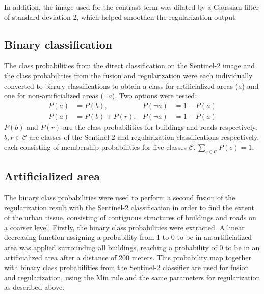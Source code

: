\documentclass[10pt]{article}
\begin{document}
In addition, the image used for the contrast term was dilated by a Gaussian filter of standard deviation 2, which helped smoothen the regularization output.

\subsection{Binary classification}
The class probabilities from the direct classification on the Sentinel-2 image and the class probabilities from the fusion and regularization were each individually converted to binary classifications to obtain a class for artificialized areas ($a$) and one for non-artificialized areas ($\neg a$). Two options were tested:
\begin{align}
    P(a)&=P(b),  &P(\neg a)&= 1 - P(a)\\
    P(a)&=P(b)+P(r),  &P(\neg a)&= 1 - P(a)
\end{align}
$P(b)$ and $P(r)$ are the class probabilities for buildings and roads respectively. $b, r\in \mathcal{C}$ are classes of the Sentinel-2 and regularization classifications respectively, each consisting of membership probabilities for five classes $\mathcal{C}, \sum_{c \in \mathcal{C}}P(c) = 1$.

\subsection{Artificialized area}
The binary class probabilities were used to perform a second fusion of the regularization result with the Sentinel-2 classification in order to find the extent of the urban tissue, consisting of contiguous structures of buildings and roads on a coarser level. Firstly, the binary class probabilities were extracted. A linear decreasing function assigning a probability from 1 to 0 to be in an artificialized area was applied surrounding all buildings, reaching a probability of 0 to be in an artificialized area after a distance of 200 meters. %
This probability map together with binary class probabilities from the Sentinel-2 classifier are used for fusion and regularization, using the Min rule and the same parameters for regularization as described above.\\
\end{document}
